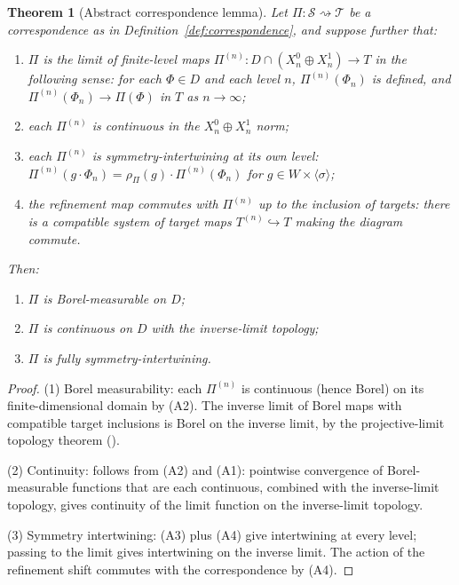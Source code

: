 \documentclass[11pt, a4paper]{amsart}
\newtheorem{theorem}{Theorem}[section]
\theoremstyle{definition}
\begin{document}
\begin{theorem}[Abstract correspondence lemma]
\label{thm:abstract-correspondence}
Let $\Pi \colon \mathcal{S} \rightsquigarrow \mathcal{T}$ be a
correspondence as in Definition~\ref{def:correspondence}, and
suppose further that:
\begin{enumerate}
\item[(A1)] $\Pi$ is the limit of finite-level maps
  $\Pi^{(n)} \colon D \cap (X_n^0 \oplus X_n^1) \to T$ in the
  following sense: for each $\Phi \in D$ and each level $n$,
  $\Pi^{(n)}(\Phi_n)$ is defined, and
  $\Pi^{(n)}(\Phi_n) \to \Pi(\Phi)$ in $T$ as $n \to \infty$;
\item[(A2)] each $\Pi^{(n)}$ is continuous in the $X_n^0 \oplus
  X_n^1$ norm;
\item[(A3)] each $\Pi^{(n)}$ is symmetry-intertwining at its own
  level: $\Pi^{(n)}(g \cdot \Phi_n) = \rho_\Pi(g) \cdot
  \Pi^{(n)}(\Phi_n)$ for $g \in W \times \langle\sigma\rangle$;
\item[(A4)] the refinement map commutes with $\Pi^{(n)}$ up to the
  inclusion of targets: there is a compatible system of target maps
  $T^{(n)} \hookrightarrow T$ making the diagram commute.
\end{enumerate}
Then:
\begin{enumerate}
\item $\Pi$ is Borel-measurable on $D$;
\item $\Pi$ is continuous on $D$ with the inverse-limit topology;
\item $\Pi$ is fully symmetry-intertwining.
\end{enumerate}
\end{theorem}

\begin{proof}
(1) Borel measurability: each $\Pi^{(n)}$ is continuous
(hence Borel) on its finite-dimensional domain by (A2). The inverse
limit of Borel maps with compatible target inclusions is Borel on
the inverse limit, by the projective-limit topology theorem
(\cite[Thm.~1.8.9]{Bogachev}).

(2) Continuity: follows from (A2) and (A1): pointwise convergence
of Borel-measurable functions that are each continuous, combined
with the inverse-limit topology, gives continuity of the limit
function on the inverse-limit topology.

(3) Symmetry intertwining: (A3) plus (A4) give intertwining at
every level; passing to the limit gives intertwining on the
inverse limit. The action of the refinement shift commutes with
the correspondence by (A4).
\end{proof}
\end{document}
